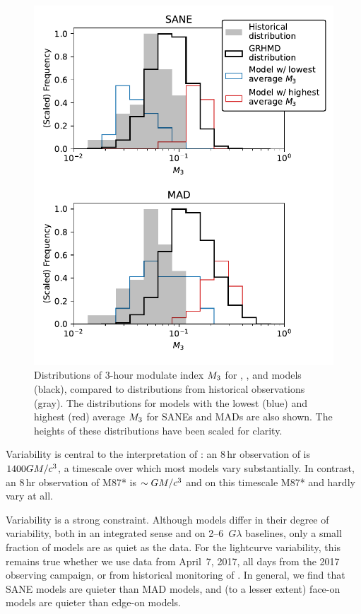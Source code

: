 \begin{figure}
  \centering
  \includegraphics[width=\columnwidth]{./figures/mi_hist.pdf}
  \caption{Distributions of 3-hour modulate index $M_{3}$ for \bhac, \kharma, and \hamr models (black), compared to distributions from historical observations (gray).
The distributions for models with the lowest (blue) and highest (red) average $M_{3}$ for SANEs and MADs are also shown.
The heights of these distributions have been scaled for clarity.}
  \label{fig:cmp_ALMA_var}
\end{figure}

Variability is central to  the interpretation of \sgra: an $8\,\mathrm{hr}$ observation of \sgra is $1400 GM/c^3$, a timescale over which most models vary substantially.
In contrast, an $8\,\mathrm{hr}$ observation of M87* is $\sim GM/c^3$ and on this timescale M87* and \sgra hardly vary at all.

Variability is a strong constraint.
Although models differ in their degree of variability, both in an integrated sense and on 2--6~$G\lambda$ baselines, only a small fraction of models are as quiet as the data.
For the lightcurve variability, this remains true whether we use data from April~7, 2017, all days from the 2017 observing campaign, or from historical monitoring of \sgra.
In general, we find that SANE models are quieter than MAD models, and (to a lesser extent) face-on models are quieter than edge-on models.


